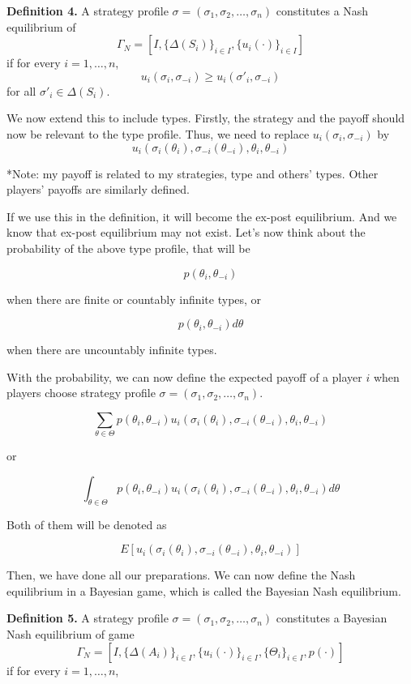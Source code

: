 \documentclass[12pt, oneside]{article}
\begin{document}
\textbf{Definition 4.} A strategy profile \( \sigma = (\sigma_1, \sigma_2, \dots, \sigma_n) \) constitutes a Nash equilibrium of 
\[
\Gamma_N = [I, \{\Delta(S_i)\}_{i\in I}, \{u_i(\cdot)\}_{i\in I}]
\]
if for every \( i = 1, \dots, n \),
\[
u_i(\sigma_i, \sigma_{-i}) \geq u_i(\sigma'_i, \sigma_{-i})
\]
for all \( \sigma'_i \in \Delta(S_i) \).

We now extend this to include types. Firstly, the strategy and the payoff should now be relevant to the type profile. Thus, we need to replace \( u_i(\sigma_i, \sigma_{-i}) \) by
\[
u_i(\sigma_i(\theta_i), \sigma_{-i}(\theta_{-i}), \theta_i, \theta_{-i})
\]

*Note: my payoff is related to my strategies, type and others’ types. Other players’ payoffs are similarly defined.

If we use this in the definition, it will become the ex-post equilibrium. And we know that ex-post equilibrium may not exist. Let's now think about the probability of the above type profile, that will be

\[
p(\theta_i, \theta_{-i})
\]

when there are finite or countably infinite types, or

\[
p(\theta_i, \theta_{-i}) d\theta
\]

when there are uncountably infinite types.

With the probability, we can now define the expected payoff of a player \( i \) when players choose strategy profile \( \sigma = (\sigma_1, \sigma_2, \dots, \sigma_n) \).

\[
\sum_{\theta \in \Theta} p(\theta_i, \theta_{-i}) u_i(\sigma_i(\theta_i), \sigma_{-i}(\theta_{-i}), \theta_i, \theta_{-i})
\]

or

\[
\int_{\theta \in \Theta} p(\theta_i, \theta_{-i}) u_i(\sigma_i(\theta_i), \sigma_{-i}(\theta_{-i}), \theta_i, \theta_{-i}) d\theta
\]

Both of them will be denoted as

\[
E[u_i(\sigma_i(\theta_i), \sigma_{-i}(\theta_{-i}), \theta_i, \theta_{-i})]
\]

Then, we have done all our preparations. We can now define the Nash equilibrium in a Bayesian game, which is called the Bayesian Nash equilibrium.

\textbf{Definition 5.} A strategy profile \( \sigma = (\sigma_1, \sigma_2, \dots, \sigma_n) \) constitutes a Bayesian Nash equilibrium of game
\[
\Gamma_N = [I, \{\Delta(A_i)\}_{i\in I}, \{u_i(\cdot)\}_{i\in I}, \{\Theta_i\}_{i\in I}, p(\cdot)]
\]
if for every \( i = 1, \dots, n \),
\end{document}
